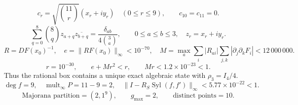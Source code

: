 \[
c_r=\sqrt{\binom{11}{r}}(x_r+i y_r)\quad(0\le r\le9),\qquad c_{10}=c_{11}=0.
\]
\[
\sum_{q=0}^{8}\binom8q z_{a+q}\overline{z_{b+q}}
=\frac{\delta_{ab}}{4\binom3a},\qquad 0\le a\le b\le3,
\quad z_r=x_r+i y_r.
\]
\[
R=DF(x_0)^{-1},\quad e=\|RF(x_0)\|_\infty<10^{-70},\quad
M=\max_a\sum_i|R_{ai}|\sum_{j,k}|\partial_j\partial_k F_i|<12\,000\,000.
\]
\[
r=10^{-30},\qquad e+Mr^2<r,\qquad Mr<1.2\times10^{-23}<1.
\]
Thus the rational box contains a unique exact algebraic state with \(\rho_3=I_4/4\).
\[
\deg f=9,\quad\operatorname{mult}_{\infty}P=11-9=2,\quad
\|I-R_S\operatorname{Syl}(f,f')\|_\infty<5.77\times10^{-22}<1.
\]
\[
\text{Majorana partition}=(2,1^9),\qquad g_{\max}=2,\qquad \text{distinct points}=10.
\]
